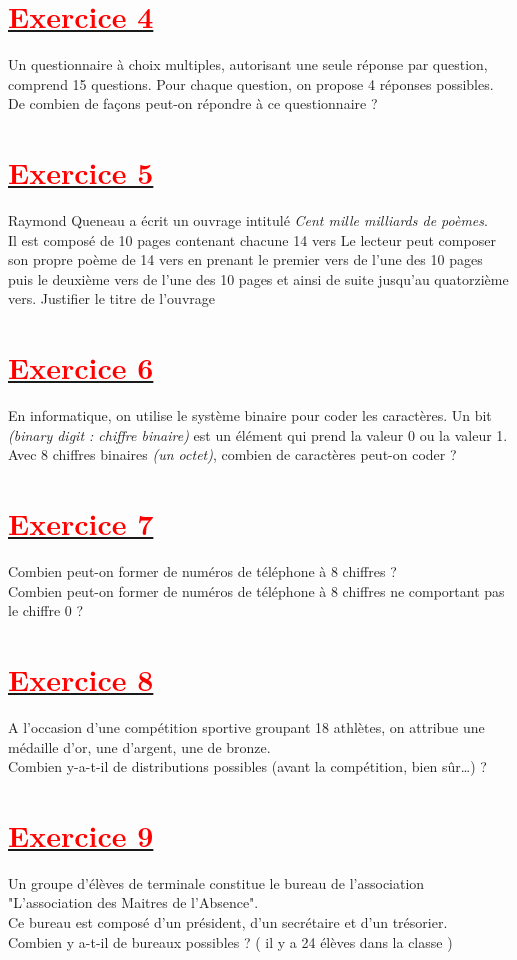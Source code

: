 \documentclass[12pt,a4paper]{article}
\begin{document}
\section*{\underline{\textbf{\textcolor{red}{Exercice 4}}}}
Un questionnaire à choix multiples, autorisant une seule réponse par question, comprend 15 questions. Pour chaque question, on propose 4 réponses possibles.
De combien de façons peut-on répondre à ce questionnaire ?
\section*{\underline{\textbf{\textcolor{red}{Exercice 5}}}}
Raymond Queneau a écrit un ouvrage intitulé \textit{Cent mille milliards de poèmes}.\\
Il est composé de 10 pages contenant chacune 14 vers
Le lecteur peut composer son propre poème de 14 vers en
prenant le premier vers de l’une des 10 pages puis le deuxième
vers de l’une des 10 pages et ainsi de suite jusqu’au
quatorzième vers. Justifier le titre de l’ouvrage
\section*{\underline{\textbf{\textcolor{red}{Exercice 6}}}}
En informatique, on utilise le système binaire pour coder les caractères.
Un bit \textit{(binary digit : chiffre binaire)} est un élément qui prend la valeur 0 ou la valeur 1. Avec 8 chiffres binaires \textit{(un octet)}, combien de caractères peut-on coder ?
\section*{\underline{\textbf{\textcolor{red}{Exercice 7}}}}
Combien peut-on former de numéros de téléphone à 8 chiffres ?\\
Combien peut-on former de numéros de téléphone à 8 chiffres ne comportant pas le chiffre 0 ?
\section*{\underline{\textbf{\textcolor{red}{Exercice 8}}}}
A l’occasion d’une compétition sportive groupant 18 athlètes, on attribue une médaille d’or, une d’argent, une de bronze.\\
Combien y-a-t-il de distributions possibles (avant la compétition, bien sûr…) ?
\section*{\underline{\textbf{\textcolor{red}{Exercice 9}}}}
Un groupe d'élèves de terminale constitue le bureau de l'association\\ "L'association des Maitres de l'Absence".\\
Ce bureau est composé d'un président, d'un secrétaire et d'un trésorier.\\
Combien y a-t-il de bureaux possibles ? ( il y a 24 élèves dans la classe )
\end{document}
